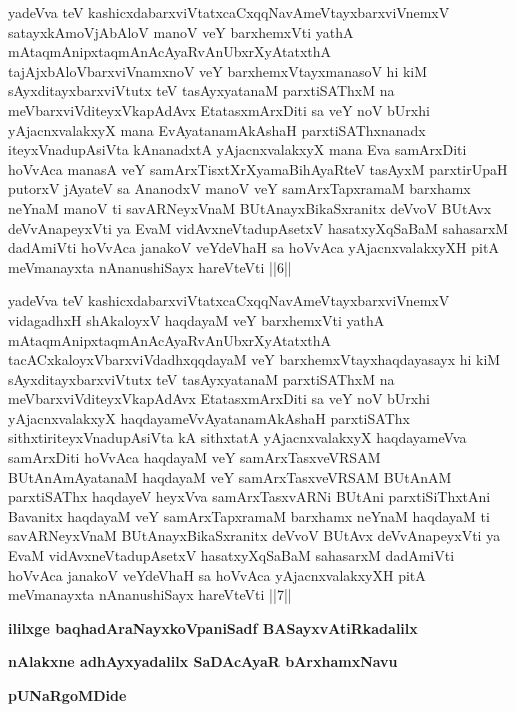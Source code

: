 
\begin{kandikeshl}
yadeVva teV kashicxdabarxviVtatxcaCxqqNavAmeVtayxbarxviVnemxV satayxkAmoV\break jAbAloV manoV veY barxhemxVti yathA mAtaqmAnipxtaqmAnAcAyaRvAnUbxrXyAtatxthA tajAjxbAloV\s barxviVnamxnoV veY barxhemxVtayxmanasoV hi kiM sAyxditayxbarxviVtutx teV tasAyxyatanaM parxtiSAThxM na meV\s barxviVditeyxVkapAdAvx EtatasxmArxDiti sa veY noV bUrxhi yAjacnxvalakxyX mana EvAyatanamAkAshaH parxtiSAThxnanadx iteyxVnadupAsiVta kAnanadxtA yAjacnxvalakxyX mana Eva samArxDiti hoVvAca manasA veY samArxTisxtXrXyamaBihAyaRteV tasAyxM parxtirUpaH putorxV jAyateV sa AnanodxV manoV veY samArxTapxramaM barxhamx neYnaM manoV ti savARNeyxVnaM BUtAnayxBikaSxranitx deVvoV BUtAvx deVvAnapeyxVti ya EvaM vidAvxneVtadupAsetxV hasatxyXqSaBaM sahasarxM dadAmiVti hoVvAca janakoV veYdeVhaH sa hoVvAca yAjacnxvalakxyXH pitA meV\s manayxta nAnanushiSayx hareVteVti ||6||
\end{kandikeshl}


\begin{kandikeshl}
yadeVva teV kashicxdabarxviVtatxcaCxqqNavAmeVtayxbarxviVnemxV vidagadhxH shAkaloyxV haqdayaM veY barxhemxVti yathA mAtaqmAnipxtaqmAnAcAyaRvAnUbxrXyAtatxthA tacACxkaloyxV\s barxviVdadhxqqdayaM veY barxhemxVtayxhaqdayasayx hi kiM sAyxditayxbarxviVtutx teV tasAyxyatanaM parxtiSAThxM na meV\s barxviVditeyxVkapAdAvx EtatasxmArxDiti sa veY noV bUrxhi yAjacnxvalakxyX haqdayameVvAyatanamAkAshaH parxtiSAThx sithxtiriteyxVnadupAsiVta kA sithxtatA yAjacnxvalakxyX haqdayameVva samArxDiti hoVvAca haqdayaM veY samArxTasxveVRSAM BUtAnAmAyatanaM haqdayaM veY samArxTasxveVRSAM BUtAnAM parxtiSAThx haqdayeV heyxVva samArxTasxvARNi BUtAni parxtiSiThxtAni Bavanitx haqdayaM veY samArxTapxramaM barxhamx neYnaM haqdayaM ti savARNeyxVnaM BUtAnayxBikaSxranitx deVvoV BUtAvx deVvAnapeyxVti ya EvaM vidAvxneVtadupAsetxV hasatxyXqSaBaM sahasarxM dadAmiVti hoVvAca janakoV veYdeVhaH sa hoVvAca yAjacnxvalakxyXH pitA meV\s manayxta nAnanushiSayx hareVteVti ||7||
\end{kandikeshl}

\begin{center}
{\bf ililxge baqhadAraNayxkoVpaniSadf BASayxvAtiRkadalilx}
\smallskip

{\bf nAlakxne adhAyxyadalilx SaDAcAyaR bArxhamxNavu}
\smallskip

{\bf pUNaRgoMDide}
\end{center}

